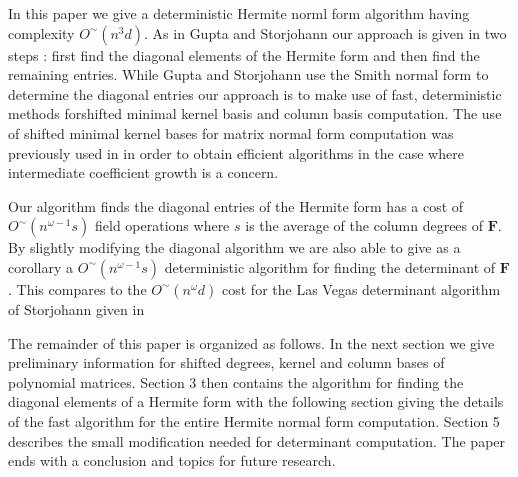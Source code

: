 In this paper we give a deterministic Hermite norml form algorithm
having complexity $O^{\sim}\left(n^{3}d\right)$. As in Gupta and
Storjohann our approach is given in two steps : first find the diagonal
elements of the Hermite form and then find the remaining entries.
While Gupta and Storjohann use the Smith normal form to determine
the diagonal entries our approach is to make use of fast, deterministic
methods forshifted minimal kernel basis and column basis computation.
The use of shifted minimal kernel bases for matrix normal form computation
was previously used in \citet{BLV:1999,BLV:jsc06} in order to obtain
efficient algorithms in the case where intermediate coefficient growth
is a concern.

Our algorithm finds the diagonal entries of the Hermite form has a
cost of $O^{\sim}\left(n^{\omega-1}s\right)$ field operations where
$s$ is the average of the column degrees of $\mathbf{F}$. By slightly
modifying the diagonal algorithm we are also able to give as a corollary
a $O^{\sim}\left(n^{\omega-1}s\right)$ deterministic algorithm for
finding the determinant of $\mathbf{F}$. This compares to the $O^{\sim}\left(n^{\omega}d\right)$
cost for the Las Vegas determinant algorithm of Storjohann given in
\citet{storjohann:2002,storjohann:2003}

The remainder of this paper is organized as follows. In the next section
we give preliminary information for shifted degrees, kernel and column
bases of polynomial matrices. Section 3 then contains the algorithm
for finding the diagonal elements of a Hermite form with the following
section giving the details of the fast algorithm for the entire Hermite
normal form computation. Section 5 describes the small modification
needed for determinant computation. The paper ends with a conclusion
and topics for future research. 
